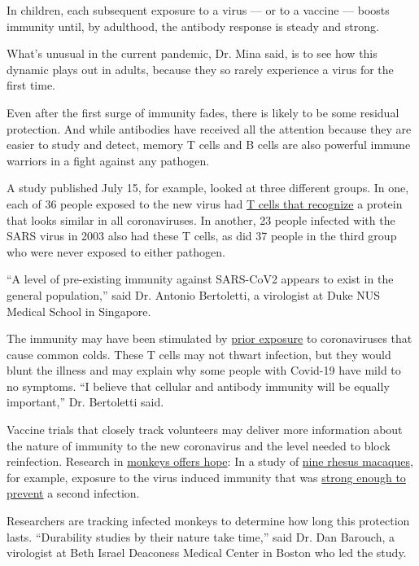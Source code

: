 In children, each subsequent exposure to a virus --- or to a vaccine ---
boosts immunity until, by adulthood, the antibody response is steady and
strong.

What's unusual in the current pandemic, Dr. Mina said, is to see how
this dynamic plays out in adults, because they so rarely experience a
virus for the first time.

Even after the first surge of immunity fades, there is likely to be some
residual protection. And while antibodies have received all the
attention because they are easier to study and detect, memory T cells
and B cells are also powerful immune warriors in a fight against any
pathogen.

A study published July 15, for example, looked at three different
groups. In one, each of 36 people exposed to the new virus had
\href{https://www.nature.com/articles/s41586-020-2550-z}{T cells that
recognize} a protein that looks similar in all coronaviruses. In
another, 23 people infected with the SARS virus in 2003 also had these T
cells, as did 37 people in the third group who were never exposed to
either pathogen.

``A level of pre-existing immunity against SARS-CoV2 appears to exist in
the general population,'' said Dr. Antonio Bertoletti, a virologist at
Duke NUS Medical School in Singapore.

The immunity may have been stimulated by
\href{https://immunology.sciencemag.org/content/5/48/eabd2071}{prior
exposure} to coronaviruses that cause common colds. These T cells may
not thwart infection, but they would blunt the illness and may explain
why some people with Covid-19 have mild to no symptoms. ``I believe that
cellular and antibody immunity will be equally important,'' Dr.
Bertoletti said.

Vaccine trials that closely track volunteers may deliver more
information about the nature of immunity to the new coronavirus and the
level needed to block reinfection. Research in
\href{https://science.sciencemag.org/content/early/2020/07/01/science.abc5343}{monkeys
offers hope}: In a study of
\href{https://science.sciencemag.org/content/early/2020/05/19/science.abc4776}{nine
rhesus macaques}, for example, exposure to the virus induced immunity
that was
\href{https://www.nytimes3xbfgragh.onion/2020/05/20/health/coronavirus-vaccine-harvard.html}{strong
enough to prevent} a second infection.

Researchers are tracking infected monkeys to determine how long this
protection lasts. ``Durability studies by their nature take time,'' said
Dr. Dan Barouch, a virologist at Beth Israel Deaconess Medical Center in
Boston who led the study.

